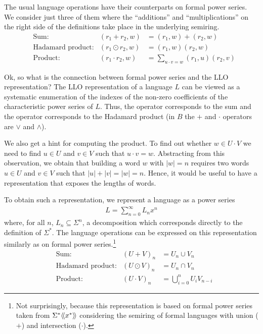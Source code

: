 The usual language operations have their counterparts on formal power
series. We consider just three of them where the ``additions'' and ``multiplications'' on the
right side of the definitions take place in the underlying semiring.
\begin{align*}
  &\text{Sum:}
  & (r_1 + r_2, w) &= (r_1, w) + (r_2, w) \\
  &\text{Hadamard product:}
  &(r_1 \odot r_2, w) &= (r_1, w) (r_2, w) \\
  &\text{Product:}
  & (r_1 \cdot r_2, w) &= \sum_{u\cdot v=w} (r_1, u) (r_2,v) 
\end{align*}

Ok, so what is the connection between formal power series and the LLO
representation? The LLO representation of a language $L$ can be viewed as a systematic
enumeration of the indexes of the non-zero coefficients of the
characteristic power series of $L$. Thus, the  operator
corresponds to the sum and the  operator corresponds
to the Hadamard product (in $B$ the $+$ and $\cdot$ operators are
$\vee$ and $\wedge$). 

We also get a hint for computing the product. To find out whether $w
\in U \cdot V$ we need to find $u\in U$ and $v\in V$ such that $u\cdot
v = w$. Abstracting from this observation, we obtain that building a
word $w$ with $|w| = n$ requires two words $u\in U$ and $v\in V$ such that $|u| +
|v| = |w| = n$. Hence, it would be useful to have a representation
that exposes the lengths of words.

To obtain such a representation, we represent a language as a power series
\begin{gather*}
  L = \sum_{n=0}^\infty L_nx^n
\end{gather*}
where, for all $n$, $L_n \subseteq \Sigma^n$, a decomposition which corresponds
directly to the definition of $\Sigma^*$. The language operations can
be expressed on this representation similarly as on formal power
series.\footnote{Not surprisingly, because this representation is
  based on formal power series taken from $\FPS[x]{\Sigma^*}$
  considering the semiring of formal languages with union ($+$)
  and intersection ($\cdot$).}
\begin{align}
  &\text{Sum:}
  & (U + V)_n &= U_n \cup V_n \\
  &\text{Hadamard product:}
  & (U \odot V)_n &= U_n \cap V_n \\
  \label{eq:1}
  &\text{Product:}
  & (U \cdot V)_n &= \bigcup_{i=0}^n U_i V_{n-i}
\end{align}

